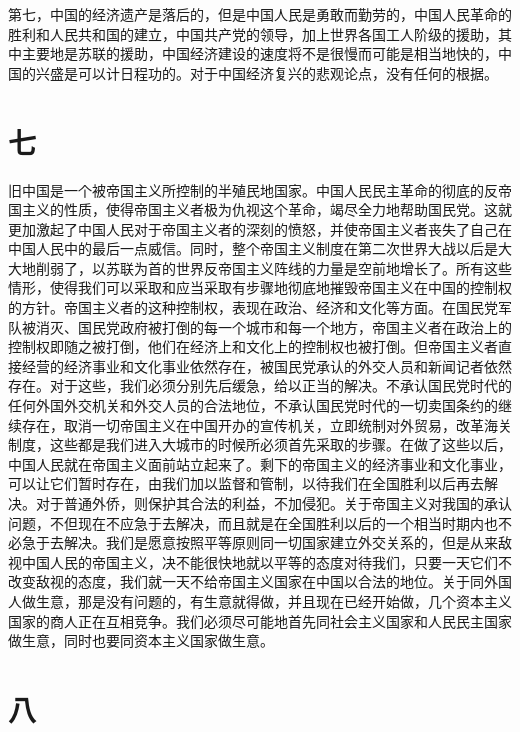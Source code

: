 第七，中国的经济遗产是落后的，但是中国人民是勇敢而勤劳的，中国人民革命的胜利和人民共和国的建立，中国共产党的领导，加上世界各国工人阶级的援助，其中主要地是苏联的援助，中国经济建设的速度将不是很慢而可能是相当地快的，中国的兴盛是可以计日程功的。对于中国经济复兴的悲观论点，没有任何的根据。

\section*{七}

旧中国是一个被帝国主义所控制的半殖民地国家。中国人民民主革命的彻底的反帝国主义的性质，使得帝国主义者极为仇视这个革命，竭尽全力地帮助国民党。这就更加激起了中国人民对于帝国主义者的深刻的愤怒，并使帝国主义者丧失了自己在中国人民中的最后一点威信。同时，整个帝国主义制度在第二次世界大战以后是大大地削弱了，以苏联为首的世界反帝国主义阵线的力量是空前地增长了。所有这些情形，使得我们可以采取和应当采取有步骤地彻底地摧毁帝国主义在中国的控制权的方针。帝国主义者的这种控制权，表现在政治、经济和文化等方面。在国民党军队被消灭、国民党政府被打倒的每一个城市和每一个地方，帝国主义者在政治上的控制权即随之被打倒，他们在经济上和文化上的控制权也被打倒。但帝国主义者直接经营的经济事业和文化事业依然存在，被国民党承认的外交人员和新闻记者依然存在。对于这些，我们必须分别先后缓急，给以正当的解决。不承认国民党时代的任何外国外交机关和外交人员的合法地位，不承认国民党时代的一切卖国条约的继续存在，取消一切帝国主义在中国开办的宣传机关，立即统制对外贸易，改革海关制度，这些都是我们进入大城市的时候所必须首先采取的步骤。在做了这些以后，中国人民就在帝国主义面前站立起来了。剩下的帝国主义的经济事业和文化事业，可以让它们暂时存在，由我们加以监督和管制，以待我们在全国胜利以后再去解决。对于普通外侨，则保护其合法的利益，不加侵犯。关于帝国主义对我国的承认问题，不但现在不应急于去解决，而且就是在全国胜利以后的一个相当时期内也不必急于去解决。我们是愿意按照平等原则同一切国家建立外交关系的，但是从来敌视中国人民的帝国主义，决不能很快地就以平等的态度对待我们，只要一天它们不改变敌视的态度，我们就一天不给帝国主义国家在中国以合法的地位。关于同外国人做生意，那是没有问题的，有生意就得做，并且现在已经开始做，几个资本主义国家的商人正在互相竞争。我们必须尽可能地首先同社会主义国家和人民民主国家做生意，同时也要同资本主义国家做生意。

\section*{八}

